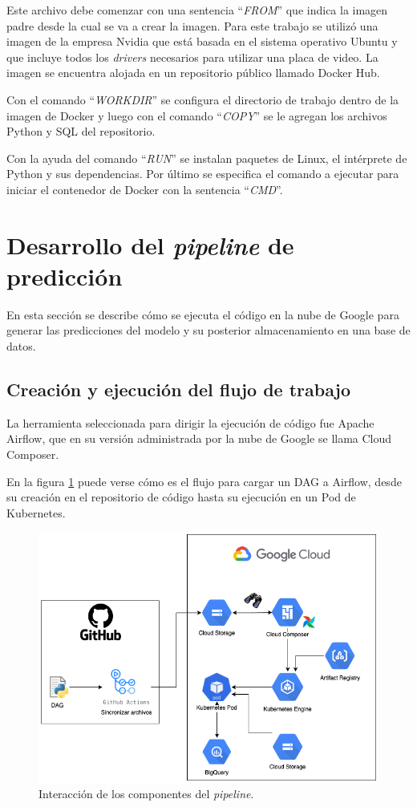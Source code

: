 Este archivo debe comenzar con una sentencia ``\textit{FROM}'' que indica la imagen padre desde la cual se va a crear la imagen. Para este trabajo se utilizó una imagen de la empresa Nvidia que está basada en el sistema operativo Ubuntu y que incluye todos los \textit{drivers} necesarios para utilizar una placa de video. La imagen se encuentra alojada en un repositorio público llamado Docker Hub.

Con el comando ``\textit{WORKDIR}'' se configura el directorio de trabajo dentro de la imagen de Docker y luego con el comando ``\textit{COPY}'' se le agregan los archivos Python y SQL del repositorio.

Con la ayuda del comando ``\textit{RUN}'' se instalan paquetes de Linux, el intérprete de Python y sus dependencias. Por último se especifica el comando a ejecutar para iniciar el contenedor de Docker con la sentencia ``\textit{CMD}''.


\section{Desarrollo del \textit{pipeline} de predicción}

En esta sección se describe cómo se ejecuta el código en la nube de Google para generar las predicciones del modelo y su posterior almacenamiento en una base de datos.

\subsection{Creación y ejecución del flujo de trabajo}

La herramienta seleccionada para dirigir la ejecución de código fue Apache Airflow, que en su versión administrada por la nube de Google se llama Cloud Composer.

En la figura \ref{fig:cap3-pipeline} puede verse cómo es el flujo para cargar un DAG a Airflow, desde su creación en el repositorio de código hasta su ejecución en un Pod de Kubernetes.

\begin{figure}[htbp]
	\centering
	\includegraphics[width=.8\textwidth]{./Figures/cap3-pipeline.png}
	\caption{Interacción de los componentes del \textit{pipeline}.}
	\label{fig:cap3-pipeline}
\end{figure}


